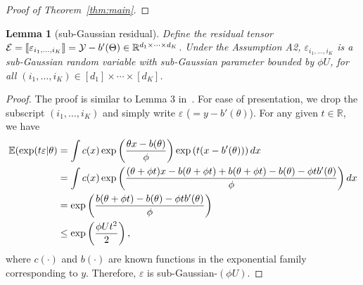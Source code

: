 \documentclass[11pt]{article}
\theoremstyle{plain}
\newtheorem{lem}{Lemma}
\theoremstyle{definition}
\begin{document}
\begin{proof}[Proof of Theorem~\ref{thm:main}]
\end{proof}

\begin{lem}[sub-Gaussian residual]\label{prop}
Define the residual tensor $\mathcal{E}=\llbracket \varepsilon_{i_1,\ldots,i_K} \rrbracket=\mathcal{Y}-b'(\Theta)\in\mathbb{R}^{d_1\times \cdots \times d_K}$. Under the Assumption A2, $\varepsilon_{i_1,\ldots,i_K}$ is a sub-Gaussian random variable with sub-Gaussian parameter bounded by $\phi U$, for all $(i_1,\ldots,i_K)\in[d_1]\times\cdots\times[d_K]$.
\end{lem}
\begin{proof} The proof is similar to Lemma 3 in~\cite{fan2019generalized}. For ease of presentation, we drop the subscript $(i_1,\ldots,i_K)$ and simply write $\varepsilon$ ($=y-b'(\theta)$). For any given $t\in\mathbb{R}$, we have
\begin{align}
\mathbb{E}(\exp(t\varepsilon|\theta)&=\int c(x) \exp\left({\theta x - b(\theta)\over \phi}   \right)\exp \left(t(x-b'(\theta))\right)dx\\
&=\int c(x)\exp \left( {(\theta + \phi t)x - b (\theta+\phi t)+b(\theta+\phi t)-b(\theta)-\phi t b'(\theta) \over \phi}\right)dx\\
&=\exp\left( {b(\theta+\phi t)-b(\theta)-\phi t b'(\theta) \over \phi} \right)\\
&\leq \exp\left(\phi U t^2\over 2 \right),
\end{align}
where $c(\cdot)$ and $b(\cdot)$ are known functions in the exponential family corresponding to $y$. 
Therefore, $\varepsilon$ is sub-Gaussian-$(\phi U)$. 
\end{proof}
\end{document}
